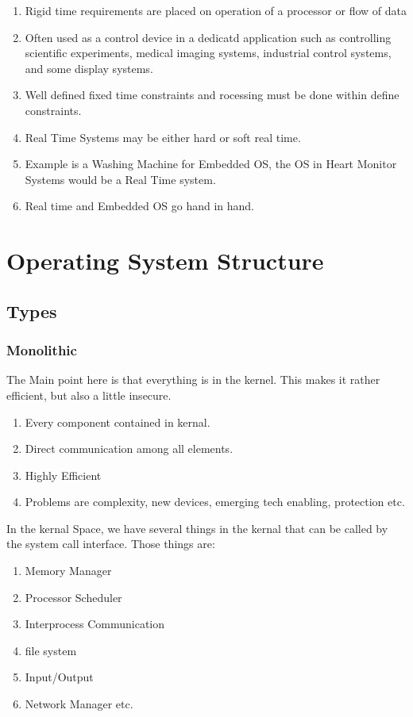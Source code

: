 \documentclass[11pt]{article}
\begin{document}
\begin{enumerate}
	\item Rigid time requirements are placed on operation of a processor or flow of data
	\item Often used as a control device in a dedicatd application such as controlling scientific experiments, medical imaging systems, industrial control systems, and some display systems.
	\item Well defined fixed time constraints and rocessing must be done within define constraints.
	\item Real Time Systems may be either hard or soft real time.
	\item Example is a Washing Machine for Embedded OS, the OS in Heart Monitor Systems would be a Real Time system.
	\item Real time and Embedded OS go hand in hand.

\end{enumerate}

\section{Operating System Structure}

\subsection{Types}
\subsubsection{Monolithic}
The Main point here is that everything is in the kernel. This makes it rather efficient, but also a little insecure.
\begin{enumerate}
	\item Every component contained in kernal.
	\item Direct communication among all elements.
	\item Highly Efficient
	\item Problems are complexity, new devices, emerging tech enabling, protection etc.
\end{enumerate}

In the kernal Space, we have several things in the kernal that can be called by the system call interface.
Those things are:
\begin{enumerate}
	\item Memory Manager
	\item Processor Scheduler
	\item Interprocess Communication
	\item file system
	\item Input/Output
	\item Network Manager etc.
\end{enumerate}
\end{document}
